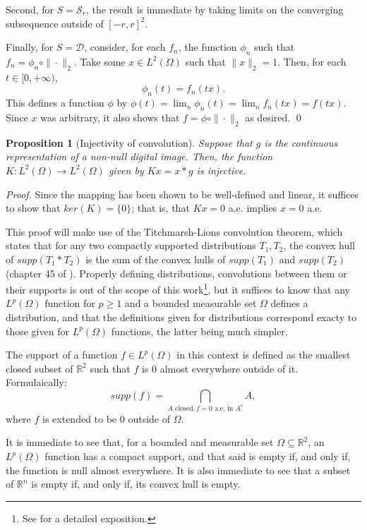 \documentclass[twocolumn,twoside,a4paper,10pt]{IEEEtran}
\newtheorem{proposition}{Proposition}
\begin{document}
Second, for \(S=\mathcal{S}_r\), the result is immediate by taking limits on the converging subsequence outside of \([-r, r]^2\).

Finally, for \(S=\mathcal{D}\), consider, for each \(f_n\), the function \(\phi_n\) such that \(f_n=\phi_n \circ \|\cdot\|_{2}\). Take some \(x\in L^2(\Omega)\) such that \(\|x\|_{2}=1\). Then, for each \(t\in[0, +\infty)\),
\[
  \phi_n(t) = f_n(tx)
.\]
This defines a function \(\phi\) by \(\phi(t)=\lim_n\phi_n(t)=\lim_nf_n(tx)=f(tx)\). Since \(x\) was arbitrary, it also shows that \(f=\phi\circ\|\cdot\|_{2}\) as desired. \qed

\begin{proposition}[Injectivity of convolution]\label{prop:injectivity-of-convolution}
  Suppose that \(g\) is the continuous representation of a non-null digital image. Then, the function \(K\colon L^2(\Omega)\to L^2(\Omega)\) given by \(Kx = x\ast g\) is injective.
\end{proposition}
\textit{Proof. } Since the mapping has been shown to be well-defined and linear, it suffices to show that \(ker(K)=\{0\}\); that is, that \(Kx=0\) a.e. implies \(x=0\) a.e.

This proof will make use of the Titchmarsh-Lions convolution theorem, which states that for any two compactly supported distributions \(T_1, T_2\), the convex hull of \(supp(T_1\ast T_2)\) is the sum of the convex hulls of \(supp(T_1)\) and \(supp(T_2)\) (chapter 45 of \cite{donoghue1969distributions}). Properly defining distributions, convolutions between them or their supports is out of the scope of this work\footnote{See \cite{donoghue1969distributions} for a detailed exposition.}, but it suffices to know that any \(L^p(\Omega)\) function for \(p\geq 1\) and a bounded measurable set \(\Omega\) defines a distribution, and that the definitions given for distributions correspond exacty to those given for \(L^p(\Omega)\) functions, the latter being much simpler.

The support of a function \(f\in L^p(\Omega)\) in this context is defined as the smallest closed subset of \(\mathbb{R}^2\) such that \(f\) is \(0\) almost everywhere outside of it. Formulaically:
\[
  supp(f) = \bigcap_{A \text{ closed}, f=0 \text{ a.e. in } A^c}A
,\]
where \(f\) is extended to be \(0\) outside of \(\Omega\).

It is immediate to see that, for a bounded and measurable set \(\Omega\subseteq \mathbb{R}^2\), an \(L^p(\Omega)\) function has a compact support, and that said is empty if, and only if, the function is null almost everywhere. It is also immediate to see that a subset of \(\mathbb{R}^n\) is empty if, and only if, its convex hull is empty.
\end{document}
